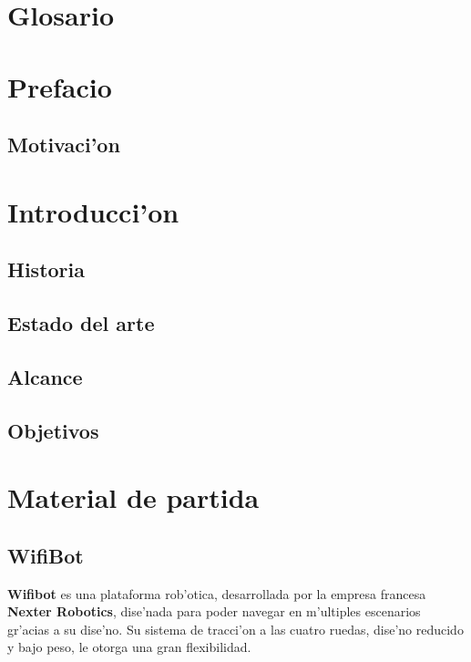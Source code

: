 \documentclass[twoside]{article}
\begin{document}
\thispagestyle{empty}
\paragraph*{}
\newpage


\tableofcontents
\setcounter{page}{1}
\newpage

\setcounter{page}{4}
\fancyhead[LE,RO]{\thepage}

\section{Glosario}
\newpage

\section{Prefacio}
\subsection{Motivaci'on}
\newpage

\section{Introducci'on}
\subsection{Historia}
\subsection{Estado del arte}
\subsection{Alcance}
\subsection{Objetivos}

\newpage
\section{Material de partida }

\subsection{WifiBot}
\textbf{Wifibot} es una plataforma rob'otica, desarrollada por la empresa francesa \textbf{Nexter Robotics}, dise'nada para poder navegar en m'ultiples escenarios gr'acias a su dise'no. Su sistema de tracci'on a las cuatro ruedas, dise'no reducido y bajo peso, le otorga una gran flexibilidad.
\end{document}

